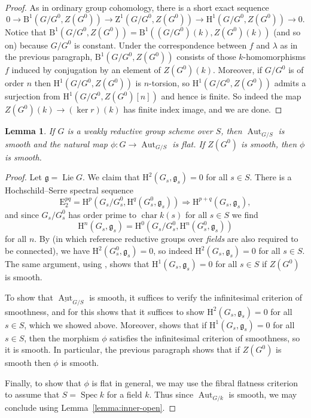 \documentclass[11pt, letterpaper,english]{amsart}
\theoremstyle{plain}
\newtheorem{lemma}[lem]{Lemma}
\theoremstyle{definition}
\numberwithin{equation}{section}
\numberwithin{lem}{section}
\newcommand{\fg}{\mathfrak{g}}
\DeclareMathOperator{\Aut}{Aut}
\DeclareMathOperator{\chara} {char}
\DeclareMathOperator{\Spec}{Spec}
\DeclareMathOperator{\Lie}{Lie}
\begin{document}
\begin{proof}
As in ordinary group cohomology, there is a short exact sequence
\[
0 \to \mathrm{B}^1(G/G^0, Z(G^0)) \to \mathrm{Z}^1(G/G^0, Z(G^0)) \to \mathrm{H}^1(G/G^0, Z(G^0)) \to 0.
\]
Notice that $\mathrm{B}^1(G/G^0, Z(G^0)) = \mathrm{B}^1((G/G^0)(k), Z(G^0)(k))$ (and so on) because $G/G^0$ is constant. Under the correspondence between $f$ and $\lambda$ as in the previous paragraph, $\mathrm{B}^1(G/G^0, Z(G^0))$ consists of those $k$-homomorphisms $f$ induced by conjugation by an element of $Z(G^0)(k)$. Moreover, if $G/G^0$ is of order $n$ then $\mathrm{H}^1(G/G^0, Z(G^0))$ is $n$-torsion, so $\mathrm{H}^1(G/G^0, Z(G^0))$ admits a surjection from $\mathrm{H}^1(G/G^0, Z(G^0)[n])$ and hence is finite. So indeed the map $Z(G^0)(k) \to (\ker r)(k)$ has finite index image, and we are done. 
\end{proof}

\begin{lemma}\label{lemma:aut-scheme-smooth}
If $G$ is a weakly reductive group scheme over $S$, then $\Aut_{G/S}$ is smooth and the natural map $\phi: G \to \Aut_{G/S}$ is flat. If $Z(G^0)$ is smooth, then $\phi$ is smooth.
\end{lemma}

\begin{proof}
Let $\fg = \Lie G$. We claim that $\mathrm{H}^2(G_s, \fg_s) = 0$ for all $s \in S$. There is a Hochschild--Serre spectral sequence
\[
\mathrm{E}_2^{pq} = \mathrm{H}^p(G_s/G_s^0, \mathrm{H}^q(G_s^0, \fg_s)) \Rightarrow \mathrm{H}^{p+q}(G_s, \fg_s),
\]
and since $G_s/G_s^0$ has order prime to $\chara k(s)$ for all $s \in S$ we find
\[
\mathrm{H}^n(G_s, \fg_s) = \mathrm{H}^0(G_s/G_s^0, \mathrm{H}^n(G_s^0, \fg_s))
\]
for all $n$. By \cite[Exp.\ XXIV, Corollaire 1.13(ii)]{sga3} (in which reference reductive groups over \textit{fields} are also required to be connected), we have $\mathrm{H}^2(G_s^0, \fg_s) = 0$, so indeed $\mathrm{H}^2(G_s, \fg_s) = 0$ for all $s \in S$. The same argument, using \cite[Exp.\ XXIV, Corollaire 1.15.1]{sga3}, shows that $\mathrm{H}^1(G_s, \fg_s) = 0$ for all $s \in S$ if $Z(G^0)$ is smooth. 

To show that $\underline{\Aut}_{G/S}$ is smooth, it suffices to verify the infinitesimal criterion of smoothness, and for this \cite[Exp.\ III, Corollaire 2.9(ii)]{sga3} shows that it suffices to show $\mathrm{H}^2(G_s, \fg_s) = 0$ for all $s \in S$, which we showed above. Moreover, \cite[Exp.\ III, Corollaire 2.9(i)]{sga3} shows that if $\mathrm{H}^1(G_s, \fg_s) = 0$ for all $s \in S$, then the morphism $\phi$ satisfies the infinitesimal criterion of smoothness, so it is smooth. In particular, the previous paragraph shows that if $Z(G^0)$ is smooth then $\phi$ is smooth. 

Finally, to show that $\phi$ is flat in general, we may use the fibral flatness criterion \cite[IV\textsubscript{3}, Th\'eor\`eme 11.3.10]{EGA} to assume that $S = \Spec k$ for a field $k$. Thus since $\Aut_{G/k}$ is smooth, we may conclude using Lemma~\ref{lemma:inner-open}.
\end{proof}
\end{document}
